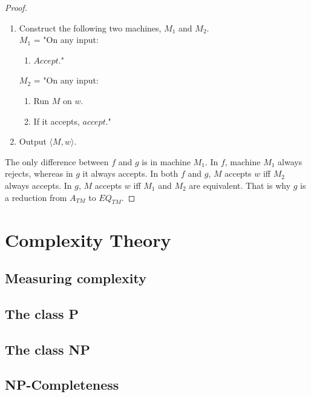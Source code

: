 \documentclass[11pt]{article}
\theoremstyle{definition}
\begin{document}
\begin{proof}
\renewcommand{\labelenumii}{\arabic{enumii}.}
\begin{enumerate}
    \item Construct the following two machines, $M_1$ and $M_2$.\\
    $M_1$ = "On any input:
    \begin{enumerate}
        \item $Accept$."
    \end{enumerate}
    $M_2$ = "On any input:
        \begin{enumerate}
        \item Run $M$ on $w$. 
        \item If it accepts, $accept$."
    \end{enumerate}
    \item Output $\langle M,w\rangle$.
\end{enumerate}
The only difference between $f$ and $g$ is in machine $M_1$. In $f$, machine $M_1$ always rejects, whereas in $g$ it always accepts. In both $f$ and $g$, $M$ accepts $w$ iff $M_2$ always accepts. In $g$, $M$ accepts $w$ iff $M_1$ and $M_2$ are equivalent. That is why $g$ is a reduction from $A_{TM}$ to $EQ_{TM}$.
\end{proof}

\section{Complexity Theory}
\subsection{Measuring complexity}
\subsection{The class P}
\subsection{The class NP}
\subsection{NP-Completeness}
\end{document}
